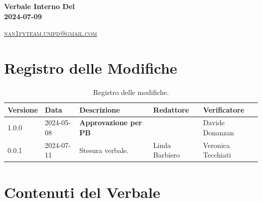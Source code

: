 \documentclass[8pt]{article}
\begin{document}
\begin{titlepage}
\begin{minipage}[t]{0.47\textwidth}
{		}
		\vspace{4mm}\vspace{4mm}
	\end{minipage}
	\vspace{4cm}
	\begin{center}
		\begin{flushright}
			{\fontsize{30pt}{52pt}\selectfont \textbf{Verbale Interno Del\\2024-07-09\\}} %
		\end{flushright}
		\vspace{3cm}
	\end{center}
	\vspace{8.5 cm}
	{\small \textsc{\href{mailto: nan1fyteam.unipd@gmail.com}{nan1fyteam.unipd@gmail.com}}}
\end{titlepage}
\pagestyle{mystyle}
\section*{Registro delle Modifiche}
\begin{table}[ht!]	
	\centering
	\begin{tabular}{p{1.2cm} p{2cm} p{5cm} p{3cm} p{3cm}}
		\toprule
		\textbf{Versione}& \textbf{Data} & \textbf{Descrizione} & \textbf{Redattore} & \textbf{Verificatore} \\
		\midrule
			1.0.0 & 2024-05-08 & \textbf{Approvazione per PB} & & Davide Donanzan \\
			0.0.1 & 2024-07-11 & Stesura verbale. & Linda Barbiero & Veronica Tecchiati
 			\\ %

		\bottomrule
	\end{tabular}
	\caption{Registro delle modifiche.}
	\label{table:Registro delle modifiche}
\end{table}
\newpage
\tableofcontents
\clearpage
\newpage
\justifying
\section{Contenuti del Verbale}
\end{document}
